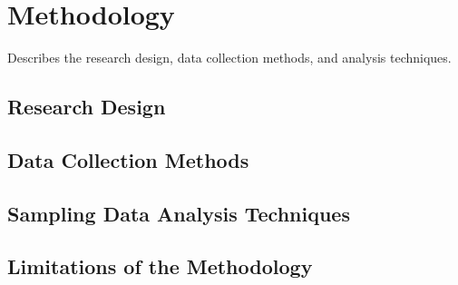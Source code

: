 \chapter{Methodology}
Describes the research design, data collection methods, and analysis techniques.
\section{Research Design}
\section{Data Collection Methods}
\section{Sampling Data Analysis Techniques}
\section{Limitations of the Methodology}
